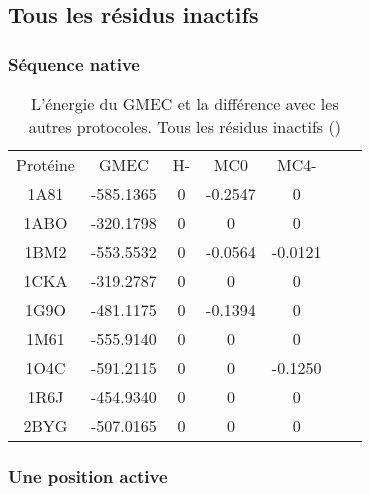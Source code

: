    \subsection{Tous les résidus inactifs}
 
   \subsubsection{Séquence native}

 
    \begin{table}[h]
      \centering

      \begin{tabular}{ccccccc}

        \toprule
        Protéine & GMEC & H- & MC0 & MC4- \\
        \cmidrule{1-5}
        1A81 & -585.1365 & 0 & -0.2547 & 0 \\
        1ABO & -320.1798 & 0 & 0 & 0 \\
        1BM2 & -553.5532 & 0 & -0.0564 & -0.0121 \\
        1CKA & -319.2787 & 0 & 0 & 0 \\
        1G9O & -481.1175 & 0 & -0.1394 & 0 \\
        1M61 & -555.9140 & 0 & 0 & 0 \\
        1O4C & -591.2115 & 0 & 0 & -0.1250 \\
        1R6J & -454.9340 & 0 & 0 & 0 \\
        2BYG & -507.0165 & 0 & 0 & 0 \\        
        \bottomrule


      \end{tabular}      
      \caption{L’énergie du GMEC et la différence avec les autres protocoles. Tous les résidus inactifs ()}
\label{tab:result_no_active}      
    \end{table}


   \subsubsection{Une position active}


